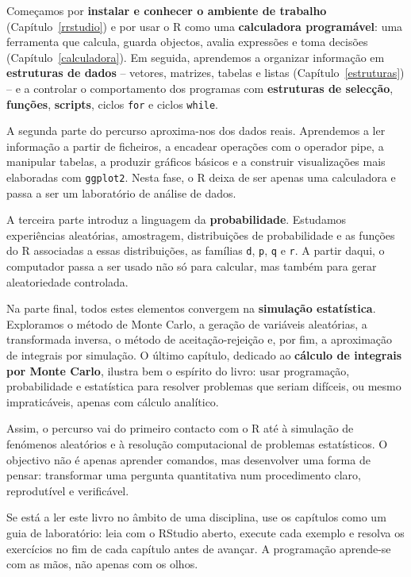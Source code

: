 \documentclass[
  portuguese,
  11pt,
  openany]{book}
\begin{document}
Começamos por \textbf{instalar e conhecer o ambiente de trabalho} (Capítulo~\ref{rrstudio}) e por usar o R como uma \textbf{calculadora programável}: uma ferramenta que calcula, guarda objectos, avalia expressões e toma decisões (Capítulo~\ref{calculadora}). Em seguida, aprendemos a organizar informação em \textbf{estruturas de dados} -- vetores, matrizes, tabelas e listas (Capítulo~\ref{estruturas}) -- e a controlar o comportamento dos programas com \textbf{estruturas de selecção}, \textbf{funções}, \textbf{scripts}, ciclos \texttt{for} e ciclos \texttt{while}.

A segunda parte do percurso aproxima-nos dos dados reais. Aprendemos a ler informação a partir de ficheiros, a encadear operações com o operador pipe, a manipular tabelas, a produzir gráficos básicos e a construir visualizações mais elaboradas com \texttt{ggplot2}. Nesta fase, o R deixa de ser apenas uma calculadora e passa a ser um laboratório de análise de dados.

A terceira parte introduz a linguagem da \textbf{probabilidade}. Estudamos experiências aleatórias, amostragem, distribuições de probabilidade e as funções do R associadas a essas distribuições, as famílias \texttt{d}, \texttt{p}, \texttt{q} e \texttt{r}. A partir daqui, o computador passa a ser usado não só para calcular, mas também para gerar aleatoriedade controlada.

Na parte final, todos estes elementos convergem na \textbf{simulação estatística}. Exploramos o método de Monte Carlo, a geração de variáveis aleatórias, a transformada inversa, o método de aceitação-rejeição e, por fim, a aproximação de integrais por simulação. O último capítulo, dedicado ao \textbf{cálculo de integrais por Monte Carlo}, ilustra bem o espírito do livro: usar programação, probabilidade e estatística para resolver problemas que seriam difíceis, ou mesmo impraticáveis, apenas com cálculo analítico.

Assim, o percurso vai do primeiro contacto com o R até à simulação de fenómenos aleatórios e à resolução computacional de problemas estatísticos. O objectivo não é apenas aprender comandos, mas desenvolver uma forma de pensar: transformar uma pergunta quantitativa num procedimento claro, reprodutível e verificável.

Se está a ler este livro no âmbito de uma disciplina, use os capítulos como um guia de laboratório: leia com o RStudio aberto, execute cada exemplo e resolva os exercícios no fim de cada capítulo antes de avançar. A programação aprende-se com as mãos, não apenas com os olhos.
\end{document}
